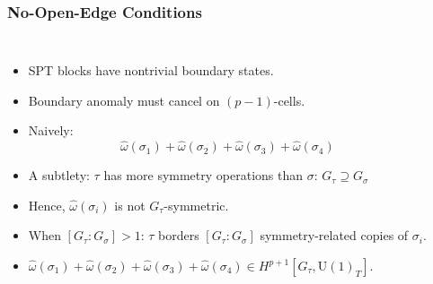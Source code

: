 \documentclass[xcolor=table, 10pt, aspectratio=43]{beamer}
\newcommand{\uone}{\mathrm U(1)}
\begin{document}
\begin{frame}
	\frametitle{No-Open-Edge Conditions}
	\begin{columns}
		\begin{itemize}
			\item SPT blocks have nontrivial boundary states.
			\item Boundary anomaly must cancel on $(p-1)$-cells.
			\item Naively:
			\[\hat\omega(\sigma_1)
			+\hat\omega(\sigma_2)+\hat\omega(\sigma_3)+\hat\omega(\sigma_4)\]
			\item A subtlety: $\tau$ has more symmetry operations than $\sigma$: $G_\tau \supseteq G_\sigma$
			\item Hence, $\hat\omega(\sigma_i)$ is not $G_\tau$-symmetric.
			\item When $[G_\tau:G_\sigma]>1$: $\tau$ borders $[G_\tau:G_\sigma]$ symmetry-related copies of $\sigma_i$.
			\item $\hat\omega(\sigma_1)
			+\hat\omega(\sigma_2)+\hat\omega(\sigma_3)+\hat\omega(\sigma_4)\in H^{p+1}[G_\tau,\uone_T]$.
		\end{itemize}
	\end{columns}
\end{frame}
\end{document}
